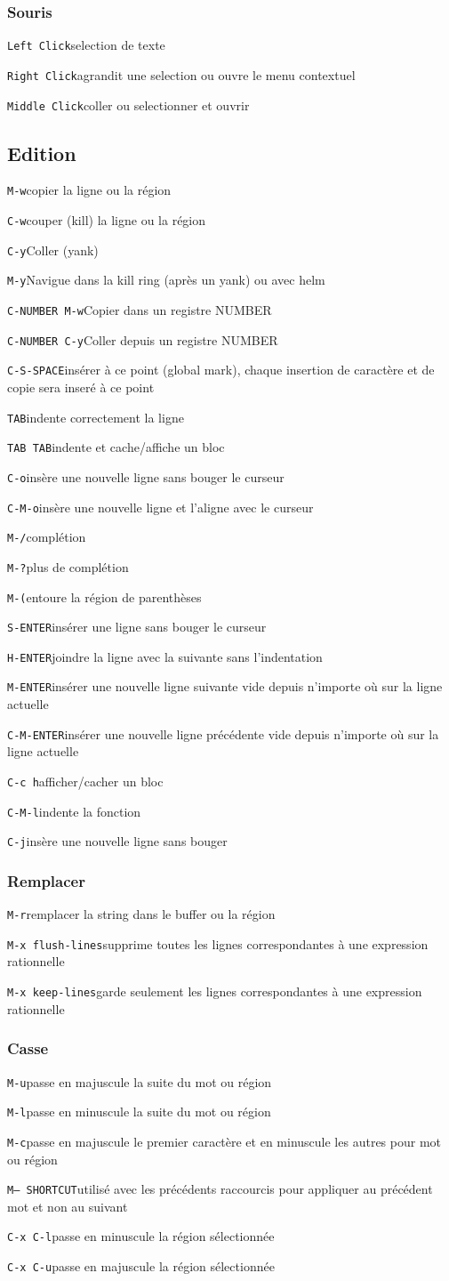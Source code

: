 \documentclass[10pt,landscape]{article}
\def\cm#1#2{{\tt#1}\dotfill#2\par}
\begin{document}
\begin{multicols}{3}
\subsubsection{Souris}
\cm{Left Click}{selection de texte}
\cm{Right Click}{agrandit une selection ou ouvre le menu contextuel}
\cm{Middle Click}{coller ou selectionner et ouvrir}





\subsection{Edition}
\cm{M-w}{copier la ligne ou la région}
\cm{C-w}{couper (kill) la ligne ou la région}
\cm{C-y}{Coller (yank)}
\cm{M-y}{Navigue dans la kill ring (après un yank) ou avec helm}
\cm{C-NUMBER M-w}{Copier dans un registre NUMBER}
\cm{C-NUMBER C-y}{Coller depuis un registre NUMBER}
\cm{C-S-SPACE}{insérer à ce point (global mark), chaque insertion de caractère et de copie sera inseré à ce point}
\cm{TAB}{indente correctement la ligne}
\cm{TAB TAB}{indente et cache/affiche un bloc}
\cm{C-o}{insère une nouvelle ligne sans bouger le curseur}
\cm{C-M-o}{insère une nouvelle ligne et l'aligne avec le curseur}
\cm{M-/}{complétion}
\cm{M-?}{plus de complétion}
\cm{M-(}{entoure la région de parenthèses}
\cm{S-ENTER}{insérer une ligne sans bouger le curseur}
\cm{H-ENTER}{joindre la ligne avec la suivante sans l'indentation}
\cm{M-ENTER}{insérer une nouvelle ligne suivante vide depuis n'importe où sur la ligne actuelle}
\cm{C-M-ENTER}{insérer une nouvelle ligne précédente vide depuis n'importe où sur la ligne actuelle}
\cm{C-c h}{afficher/cacher un bloc}
\cm{C-M-l}{indente la fonction}
\cm{C-j}{insère une nouvelle ligne sans bouger}

\subsubsection{Remplacer}
\cm{M-r}{remplacer la string dans le buffer ou la région}
\cm{M-x flush-lines}{supprime toutes les lignes correspondantes à une expression rationnelle}
\cm{M-x keep-lines}{garde seulement les lignes correspondantes à une expression rationnelle}

\subsubsection{Casse}
\cm{M-u}{passe en majuscule la suite du mot ou région}
\cm{M-l}{passe en minuscule la suite du mot ou région}
\cm{M-c}{passe en majuscule le premier caractère et en minuscule les autres pour mot ou région}
\cm{M-- SHORTCUT}{utilisé avec les précédents raccourcis pour appliquer au précédent mot et non au suivant}
\cm{C-x C-l}{passe en minuscule la région sélectionnée}
\cm{C-x C-u}{passe en majuscule la région sélectionnée}



\end{multicols}
\end{document}
